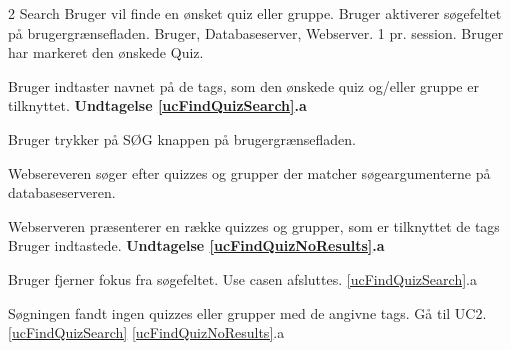 \uchead
	{2}
	{Search}
	{Bruger vil finde en ønsket quiz eller gruppe.}
	{Bruger aktiverer søgefeltet på brugergrænsefladen.}
	{Bruger, Databaseserver, Webserver.}
	{}
	{1 pr. session.}
	{Bruger har markeret den ønskede Quiz.}

\item \label{ucFindQuizSearch} Bruger indtaster navnet på de tags, som den ønskede quiz og/eller gruppe er tilknyttet. 
\textbf{Undtagelse \ref{ucFindQuizSearch}.a}
\item Bruger trykker på SØG knappen på brugergrænsefladen.
\item Websereveren søger efter quizzes og grupper der matcher søgeargumenterne på databaseserveren.

\item \label{ucFindQuizNoResults} Webserveren præsenterer en række quizzes og grupper, som er tilknyttet de tags Bruger indtastede.
\textbf{Undtagelse \ref{ucFindQuizNoResults}.a}


\ucdescriptionend

\ucextension
	{Bruger fjerner fokus fra søgefeltet.}
	{Use casen afsluttes.}
	{\ref{ucFindQuizSearch}.a}

\ucextension
	{Søgningen fandt ingen quizzes eller grupper med de angivne tags.}
	{Gå til UC2.\ref{ucFindQuizSearch}}
	{\ref{ucFindQuizNoResults}.a}
				
